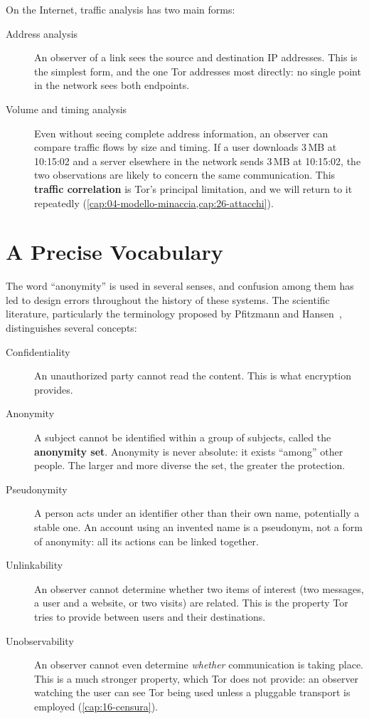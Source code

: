 On the Internet, traffic analysis has two main forms:
\begin{description}
  \item[Address analysis] An observer of a link sees the source and destination IP addresses. This is the simplest form, and the one Tor addresses most directly: no single point in the network sees both endpoints.
  \item[Volume and timing analysis] Even without seeing complete address information, an observer can compare traffic flows by size and timing. If a user downloads 3\,MB at 10:15:02 and a server elsewhere in the network sends 3\,MB at 10:15:02, the two observations are likely to concern the same communication. This \textbf{traffic correlation} is Tor's principal limitation, and we will return to it repeatedly (\cref{cap:04-modello-minaccia,cap:26-attacchi}).
\end{description}

\section{A Precise Vocabulary}\label{sec:anon-termini}

The word \enquote{anonymity} is used in several senses, and confusion among them has led to design errors throughout the history of these systems. The scientific literature, particularly the terminology proposed by Pfitzmann and Hansen~\cite{pfitzmann2010terminology}, distinguishes several concepts:
\begin{description}
  \item[Confidentiality] An unauthorized party cannot read the content. This is what encryption provides.
  \item[Anonymity] A subject cannot be identified within a group of subjects, called the \textbf{anonymity set}. Anonymity is never absolute: it exists \enquote{among} other people. The larger and more diverse the set, the greater the protection.
  \item[Pseudonymity] A person acts under an identifier other than their own name, potentially a stable one. An account using an invented name is a pseudonym, not a form of anonymity: all its actions can be linked together.
  \item[Unlinkability] An observer cannot determine whether two items of interest (two messages, a user and a website, or two visits) are related. This is the property Tor tries to provide between users and their destinations.
  \item[Unobservability] An observer cannot even determine \emph{whether} communication is taking place. This is a much stronger property, which Tor does not provide: an observer watching the user can see Tor being used unless a pluggable transport is employed (\cref{cap:16-censura}).
\end{description}

